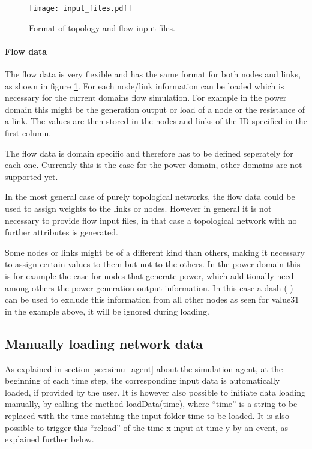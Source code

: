 \documentclass[11pt,fleqn]{book} %
\begin{document}
\begin{figure}[!h]
\centering\texttt{[image: input\_files.pdf]}
\caption{Format of topology and flow input files.}
\label{fig:input_files}
\end{figure}

\paragraph{Flow data} The flow data is very flexible and has the same format for both nodes and links, as shown in figure \ref{fig:input_files}. For each node/link information can be loaded which is necessary for the current domains flow simulation. For example in the power domain this might be the generation output or load of a node or the resistance of a link. The values are then stored in the nodes and links of the ID specified in the first column. 

The flow data is domain specific and therefore has to be defined seperately for each one. Currently this is the case for the power domain, other domains are not supported yet.

In the most general case of purely topological networks, the flow data could be used to assign weights to the links or nodes. However in general it is not necessary to provide flow input files, in that case a topological network with no further attributes is generated.

Some nodes or links might be of a different kind than others, making it necessary to assign certain values to them but not to the others. In the power domain this is for example the case for nodes that generate power, which additionally need among others the power generation output information. In this case a dash (-) can be used to exclude this information from all other nodes as seen for value31 in the example above, it will be ignored during loading. 

\subsection{Manually loading network data}
As explained in section \ref{sec:simu_agent} about the simulation agent, at the beginning of each time step, the corresponding input data is automatically loaded, if provided by the user. It is however also possible to initiate data loading manually, by calling the method loadData(time), where “time” is a string to be replaced with the time matching the input folder time to be loaded. It is also possible to trigger this “reload” of the time x input at time y by an event, as explained further below.
\end{document}
